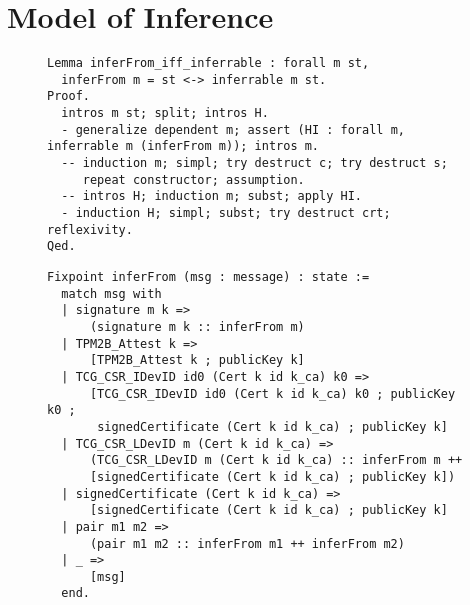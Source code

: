 \chapter{Model of Inference}

\begin{figure}[h]
\begin{lstlisting}[language=Coq]
Lemma inferFrom_iff_inferrable : forall m st,
  inferFrom m = st <-> inferrable m st.
Proof.
  intros m st; split; intros H.
  - generalize dependent m; assert (HI : forall m, inferrable m (inferFrom m)); intros m.
  -- induction m; simpl; try destruct c; try destruct s; 
     repeat constructor; assumption.
  -- intros H; induction m; subst; apply HI.
  - induction H; simpl; subst; try destruct crt; reflexivity.
Qed.
\end{lstlisting}
\end{figure}



\begin{figure}[h]
\begin{lstlisting}[language=Coq]
Fixpoint inferFrom (msg : message) : state :=
  match msg with
  | signature m k => 
      (signature m k :: inferFrom m)
  | TPM2B_Attest k => 
      [TPM2B_Attest k ; publicKey k]
  | TCG_CSR_IDevID id0 (Cert k id k_ca) k0 => 
      [TCG_CSR_IDevID id0 (Cert k id k_ca) k0 ; publicKey k0 ; 
       signedCertificate (Cert k id k_ca) ; publicKey k]
  | TCG_CSR_LDevID m (Cert k id k_ca) => 
      (TCG_CSR_LDevID m (Cert k id k_ca) :: inferFrom m ++ 
      [signedCertificate (Cert k id k_ca) ; publicKey k])
  | signedCertificate (Cert k id k_ca) => 
      [signedCertificate (Cert k id k_ca) ; publicKey k]
  | pair m1 m2 => 
      (pair m1 m2 :: inferFrom m1 ++ inferFrom m2)
  | _ => 
      [msg]
  end.
\end{lstlisting}
\end{figure}



